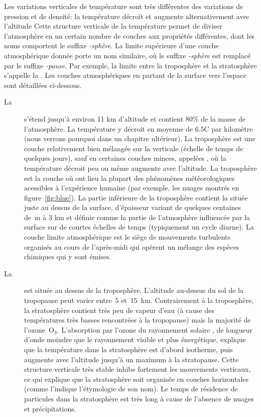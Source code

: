 \sk
Les variations verticales de température sont très différentes des variations de pression et de densité: la température décroît et augmente alternativement avec l'altitude%
Cette structure verticale de la température permet de diviser l'atmosphère en un certain nombre de couches aux propriétés différentes, dont les noms comportent le suffixe \emph{-sphère}. La limite supérieure d'une couche atmosphérique donnée porte un nom similaire, où le suffixe \emph{-sphère} est remplacé par le suffixe \emph{-pause}. Par exemple, la limite entre la troposphère et la stratosphère s'appelle la . Les couches atmosphériques en partant de la surface vers l'espace sont détaillées ci-dessous.

\sk
\begin{description} 
\item[La ] \normalsize s'étend jusqu'à environ 11 km d'altitude et contient 80\% de la masse de l'atmosphère. La température y décroit en moyenne de 6.5\deg C par kilomètre (nous verrons pourquoi dans un chapitre ultérieur). La troposphère est une couche relativement bien mélangée sur la verticale (échelle de temps de quelques jours), sauf en certaines couches minces, appelées , où la température décroit peu ou même augmente avec l'altitude. La troposphère est la couche où ont lieu la plupart des phénomènes météorologiques acessibles à l'expérience humaine (par exemple, les nuages montrés en figure~\ref{fig:blue}). La partie inférieure de la troposphère contient la  située juste au dessus de la surface, d'épaisseur variant de quelques centaines de~m à 3 km et définie comme la partie de l'atmosphère influencée par la surface sur de courtes échelles de temps (typiquement un cycle diurne). La couche limite atmosphérique est le siège de mouvements turbulents organisés au cours de l'après-midi qui opèrent un mélange des espèces chimiques qui y sont émises. \normalsize
\item[La ] \normalsize est située au dessus de la troposphère. L'altitude au-dessus du sol de la tropopause peut varier entre~$5$ et~$15$~km. Contrairement à la troposphère, la stratosphère contient très peu de vapeur d'eau (à cause des températures très basses rencontrées à la tropopause) mais la majorité de l'ozone~O$_3$. L'absorption par l'ozone du rayonnement solaire , de longueur d'onde moindre que le rayonnement visible et plus énergétique, explique que la température dans la stratosphère est d'abord isotherme, puis augmente avec l'altitude jusqu'à un maximum à la stratopause. Cette structure verticale très stable inhibe fortement les mouvements verticaux, ce qui explique que la stratosphère soit organisée en couches horizontales (comme l'indique l'étymologie de son nom). Le temps de résidence de particules dans la stratosphère est très long à cause de l'absence de nuages et précipitations. \normalsize

\end{description}
